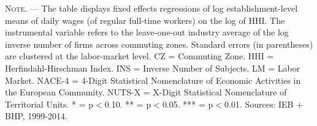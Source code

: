 \documentclass[11pt,oneside,reqno,xcolor=dvipsnames]{article} %
\begin{document}
\begin{appendix}
\begin{refsection}
\begin{landscape}
\begin{table}[!ht]
{\begin{threeparttable}
\begin{tablenotes}
\item \footnotesize \textsc{Note. ---} The table displays fixed effects regressions of log establishment-level means of daily wages (of regular full-time workers) on the log of HHI. The instrumental variable refers to the leave-one-out industry average of the log inverse number of firms across commuting zones. Standard errors (in parentheses) are clustered at the labor-market level. CZ = Commuting Zone. HHI = Herfindahl-Hirschman Index. INS = Inverse Number of Subjects. LM = Labor Market. NACE-4 = 4-Digit Statistical Nomenclature of Economic Activities in the European Community. NUTS-X = X-Digit Statistical Nomenclature of Territorial Units. * = p$<$0.10. ** = p$<$0.05. *** = p$<$0.01. Sources: IEB $\plus$ BHP, 1999-2014.
\end{tablenotes}
\end{threeparttable}
}
\end{table}


\vspace*{\fill}
\clearpage
\vspace*{\fill}



\end{landscape}
\end{refsection}
\end{appendix}
\end{document}
